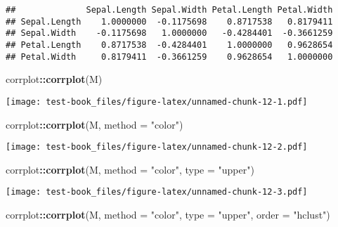 \documentclass[]{book}
\newenvironment{Shaded}{\begin{snugshade}}{\end{snugshade}}
\newcommand{\DataTypeTok}[1]{\textcolor[rgb]{0.13,0.29,0.53}{#1}}
\newcommand{\KeywordTok}[1]{\textcolor[rgb]{0.13,0.29,0.53}{\textbf{#1}}}
\newcommand{\NormalTok}[1]{#1}
\newcommand{\OperatorTok}[1]{\textcolor[rgb]{0.81,0.36,0.00}{\textbf{#1}}}
\newcommand{\StringTok}[1]{\textcolor[rgb]{0.31,0.60,0.02}{#1}}
\begin{document}
\begin{verbatim}
##              Sepal.Length Sepal.Width Petal.Length Petal.Width
## Sepal.Length    1.0000000  -0.1175698    0.8717538   0.8179411
## Sepal.Width    -0.1175698   1.0000000   -0.4284401  -0.3661259
## Petal.Length    0.8717538  -0.4284401    1.0000000   0.9628654
## Petal.Width     0.8179411  -0.3661259    0.9628654   1.0000000
\end{verbatim}

\begin{Shaded}
\end{Shaded}

\begin{Shaded}
\begin{Highlighting}[]
\NormalTok{corrplot}\OperatorTok{::}\KeywordTok{corrplot}\NormalTok{(M)}
\end{Highlighting}
\end{Shaded}

\texttt{[image: test-book\_files/figure-latex/unnamed-chunk-12-1.pdf]}

\begin{Shaded}
\begin{Highlighting}[]
\NormalTok{corrplot}\OperatorTok{::}\KeywordTok{corrplot}\NormalTok{(M, }\DataTypeTok{method =} \StringTok{"color"}\NormalTok{)}
\end{Highlighting}
\end{Shaded}

\texttt{[image: test-book\_files/figure-latex/unnamed-chunk-12-2.pdf]}

\begin{Shaded}
\begin{Highlighting}[]
\NormalTok{corrplot}\OperatorTok{::}\KeywordTok{corrplot}\NormalTok{(M, }\DataTypeTok{method =} \StringTok{"color"}\NormalTok{, }\DataTypeTok{type =} \StringTok{"upper"}\NormalTok{)}
\end{Highlighting}
\end{Shaded}

\texttt{[image: test-book\_files/figure-latex/unnamed-chunk-12-3.pdf]}

\begin{Shaded}
\begin{Highlighting}[]
\NormalTok{corrplot}\OperatorTok{::}\KeywordTok{corrplot}\NormalTok{(M, }\DataTypeTok{method =} \StringTok{"color"}\NormalTok{, }\DataTypeTok{type =} \StringTok{"upper"}\NormalTok{, }\DataTypeTok{order =} \StringTok{"hclust"}\NormalTok{)}
\end{Highlighting}
\end{Shaded}
\end{document}
